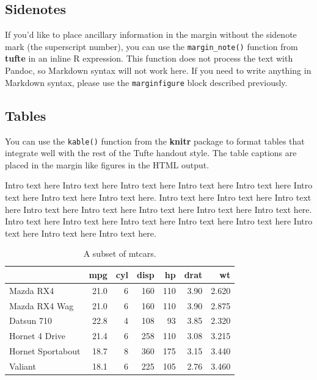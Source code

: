 \documentclass[]{tufte-handout}
\begin{document}
\hypertarget{sidenotes}{%
\subsection{Sidenotes}\label{sidenotes}}

If you'd like to place ancillary information in the margin without the
sidenote mark (the superscript number), you can use the
\texttt{margin\_note()} function from \textbf{tufte} in an inline R
expression.
This function does not process the text with Pandoc, so Markdown syntax
will not work here. If you need to write anything in Markdown syntax,
please use the \texttt{marginfigure} block described previously.

\hypertarget{tables}{%
\subsection{Tables}\label{tables}}

You can use the \texttt{kable()} function from the \textbf{knitr}
package to format tables that integrate well with the rest of the Tufte
handout style. The table captions are placed in the margin like figures
in the HTML output.

Intro text here Intro text here Intro text here Intro text here Intro
text here Intro text here Intro text here Intro text here. Intro text
here Intro text here Intro text here Intro text here Intro text here
Intro text here Intro text here Intro text here. Intro text here Intro
text here Intro text here Intro text here Intro text here Intro text
here Intro text here Intro text here.

\begin{table}

\caption{\label{tab:unnamed-chunk-13}A subset of mtcars.}
\centering
\begin{tabular}[t]{l|r|r|r|r|r|r}
\hline
  & mpg & cyl & disp & hp & drat & wt\\
\hline
Mazda RX4 & 21.0 & 6 & 160 & 110 & 3.90 & 2.620\\
\hline
Mazda RX4 Wag & 21.0 & 6 & 160 & 110 & 3.90 & 2.875\\
\hline
Datsun 710 & 22.8 & 4 & 108 & 93 & 3.85 & 2.320\\
\hline
Hornet 4 Drive & 21.4 & 6 & 258 & 110 & 3.08 & 3.215\\
\hline
Hornet Sportabout & 18.7 & 8 & 360 & 175 & 3.15 & 3.440\\
\hline
Valiant & 18.1 & 6 & 225 & 105 & 2.76 & 3.460\\
\hline
\end{tabular}
\end{table}
\end{document}
